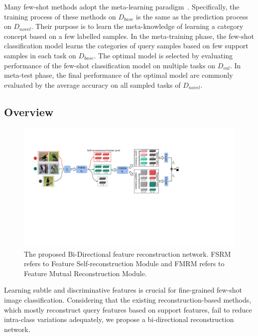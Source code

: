 \documentclass[letterpaper]{article} %
\begin{document}
Many few-shot methods adopt the meta-learning paradigm~\cite{Finn2017ModelAgnosticMF, ye2022how}. Specifically, the training process of these methods on $D_{base}$ is the same as the prediction process on $D_{novel}$. Their purpose is to learn the meta-knowledge of learning a category concept based on a few labelled samples.
In the meta-training phase, the few-shot classification model learns the categories of query samples based on few support samples in each task on $D_{base}$. The optimal model is selected by evaluating performance of the {few-shot classification model} on multiple tasks on $D_{val}$. In meta-test phase, the final performance of the optimal model are commonly evaluated by the average accuracy on all sampled tasks of $D_{novel}$.

\subsection{Overview}

\begin{figure}[!ht]
  \centering
  \includegraphics[width=0.9\linewidth]{figures/3.1.pdf}
  \caption{The proposed Bi-Directional feature reconstruction network. FSRM refers to Feature Self-reconstruction Module and FMRM refers to Feature Mutual Reconstruction Module.}
  \label{fig:3.1}
\end{figure}

Learning subtle and discriminative features is crucial for fine-grained few-shot image classification. Considering that the existing reconstruction-based methods, which mostly reconstruct query features based on support features, fail to reduce intra-class variations adequately, we propose a  bi-directional reconstruction network.
\end{document}
